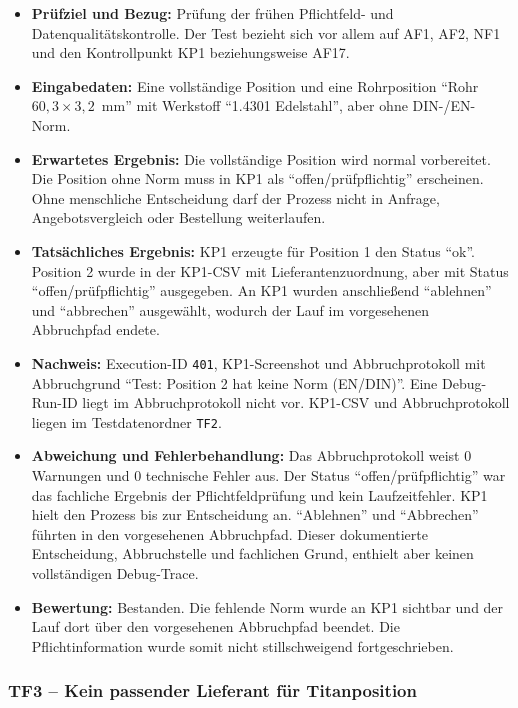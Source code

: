 \documentclass[a4paper,12pt]{article}
\begin{document}
\begin{itemize}
    \setlength{\itemsep}{3pt}
    \setlength{\parsep}{0pt}
    \item \textbf{Prüfziel und Bezug:} Prüfung der frühen Pflichtfeld- und Datenqualitätskontrolle. Der Test bezieht sich vor allem auf AF1, AF2, NF1 und den Kontrollpunkt KP1 beziehungsweise AF17.
    \item \textbf{Eingabedaten:} Eine vollständige Position und eine Rohrposition \enquote{Rohr \(60{,}3 \times 3{,}2\)~mm} mit Werkstoff \enquote{1.4301 Edelstahl}, aber ohne DIN-/EN-Norm.
    \item \textbf{Erwartetes Ergebnis:} Die vollständige Position wird normal vorbereitet. Die Position ohne Norm muss in KP1 als \enquote{offen/prüfpflichtig} erscheinen. Ohne menschliche Entscheidung darf der Prozess nicht in Anfrage, Angebotsvergleich oder Bestellung weiterlaufen.
    \item \textbf{Tatsächliches Ergebnis:} KP1 erzeugte für Position 1 den Status \enquote{ok}. Position 2 wurde in der KP1-CSV mit Lieferantenzuordnung, aber mit Status \enquote{offen/prüfpflichtig} ausgegeben. An KP1 wurden anschließend \enquote{ablehnen} und \enquote{abbrechen} ausgewählt, wodurch der Lauf im vorgesehenen Abbruchpfad endete.
    \item \textbf{Nachweis:} Execution-ID \texttt{401}, KP1-Screenshot und Abbruchprotokoll mit Abbruchgrund \enquote{Test: Position 2 hat keine Norm (EN/DIN)}. Eine Debug-Run-ID liegt im Abbruchprotokoll nicht vor. KP1-CSV und Abbruchprotokoll liegen im Testdatenordner \nolinkurl{TF2}.
    \item \textbf{Abweichung und Fehlerbehandlung:} Das Abbruchprotokoll weist 0 Warnungen und 0 technische Fehler aus. Der Status \enquote{offen/prüfpflichtig} war das fachliche Ergebnis der Pflichtfeldprüfung und kein Laufzeitfehler. KP1 hielt den Prozess bis zur Entscheidung an. \enquote{Ablehnen} und \enquote{Abbrechen} führten in den vorgesehenen Abbruchpfad. Dieser dokumentierte Entscheidung, Abbruchstelle und fachlichen Grund, enthielt aber keinen vollständigen Debug-Trace.
    \item \textbf{Bewertung:} Bestanden. Die fehlende Norm wurde an KP1 sichtbar und der Lauf dort über den vorgesehenen Abbruchpfad beendet. Die Pflichtinformation wurde somit nicht stillschweigend fortgeschrieben.
\end{itemize}

\subsubsection{TF3 -- Kein passender Lieferant für Titanposition}
\end{document}
